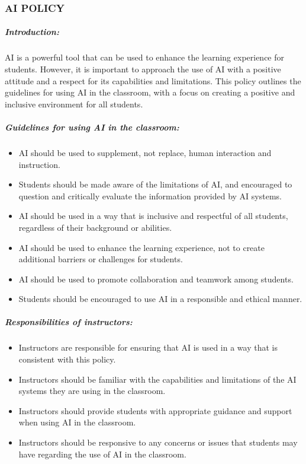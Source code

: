 \documentclass[
]{article}
\providecommand{\tightlist}{%
  \setlength{\itemsep}{0pt}\setlength{\parskip}{0pt}}
\begin{document}
\hypertarget{ai-policy}{%
\subsubsection{AI POLICY}\label{ai-policy}}

\hypertarget{introduction}{%
\subparagraph{Introduction:}\label{introduction}}

AI is a powerful tool that can be used to enhance the learning
experience for students. However, it is important to approach the use of
AI with a positive attitude and a respect for its capabilities and
limitations. This policy outlines the guidelines for using AI in the
classroom, with a focus on creating a positive and inclusive environment
for all students.

\hypertarget{guidelines-for-using-ai-in-the-classroom}{%
\subparagraph{Guidelines for using AI in the
classroom:}\label{guidelines-for-using-ai-in-the-classroom}}

\begin{itemize}
\tightlist
\item
  AI should be used to supplement, not replace, human interaction and
  instruction.
\item
  Students should be made aware of the limitations of AI, and encouraged
  to question and critically evaluate the information provided by AI
  systems.
\item
  AI should be used in a way that is inclusive and respectful of all
  students, regardless of their background or abilities.
\item
  AI should be used to enhance the learning experience, not to create
  additional barriers or challenges for students.
\item
  AI should be used to promote collaboration and teamwork among
  students.
\item
  Students should be encouraged to use AI in a responsible and ethical
  manner.
\end{itemize}

\hypertarget{responsibilities-of-instructors}{%
\subparagraph{Responsibilities of
instructors:}\label{responsibilities-of-instructors}}

\begin{itemize}
\tightlist
\item
  Instructors are responsible for ensuring that AI is used in a way that
  is consistent with this policy.
\item
  Instructors should be familiar with the capabilities and limitations
  of the AI systems they are using in the classroom.
\item
  Instructors should provide students with appropriate guidance and
  support when using AI in the classroom.
\item
  Instructors should be responsive to any concerns or issues that
  students may have regarding the use of AI in the classroom.
\end{itemize}
\end{document}
